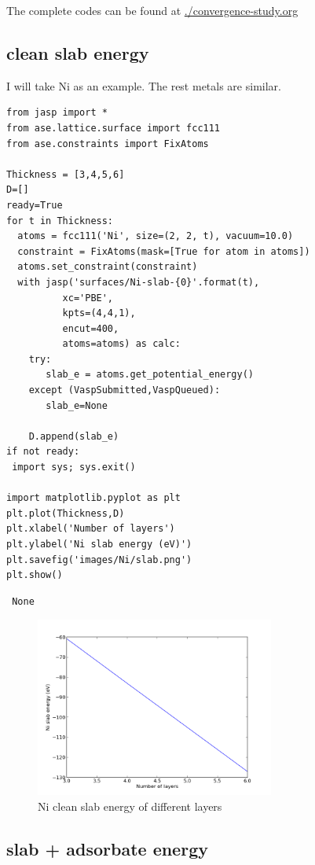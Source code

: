 \documentclass[11pt]{article}
\begin{document}
The complete codes can be found at \href{file:///home/yichuns/FinalProject/convergence-study.org}{./convergence-study.org}
\subsection{clean slab energy}
\label{sec-3-3}

I will take Ni as an example. The rest metals are similar.

\begin{verbatim}
from jasp import *
from ase.lattice.surface import fcc111
from ase.constraints import FixAtoms

Thickness = [3,4,5,6]
D=[]
ready=True
for t in Thickness:
  atoms = fcc111('Ni', size=(2, 2, t), vacuum=10.0)
  constraint = FixAtoms(mask=[True for atom in atoms])
  atoms.set_constraint(constraint)
  with jasp('surfaces/Ni-slab-{0}'.format(t),
          xc='PBE',
          kpts=(4,4,1),
          encut=400,
          atoms=atoms) as calc:
    try:
       slab_e = atoms.get_potential_energy()
    except (VaspSubmitted,VaspQueued):
       slab_e=None

    D.append(slab_e)
if not ready:
 import sys; sys.exit()

import matplotlib.pyplot as plt
plt.plot(Thickness,D)
plt.xlabel('Number of layers')
plt.ylabel('Ni slab energy (eV)')
plt.savefig('images/Ni/slab.png')
plt.show()
\end{verbatim}

\begin{verbatim}
 None
\end{verbatim}
\begin{figure}[H]
\centering
\includegraphics[width=0.7\textwidth]{./images/Ni/slab.png}
\caption{Ni clean slab energy of different layers}
\end{figure}
\subsection{slab + adsorbate energy}
\label{sec-3-4}
\end{document}
